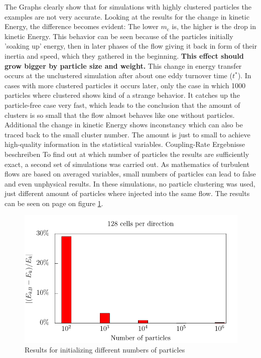 \documentclass[a4paper,10pt]{article}
\numberwithin{equation}{section} %
\begin{document}
The Graphs clearly show that for simulations with highly clustered particles the examples are not very accurate. Looking at the results for the change in kinetic Energy, the difference becomes evident: The lower $ m_\mathrm{c} $ is, the higher is the drop in kinetic Energy. This behavior can be seen because of the particles initially 'soaking up' energy, then in later phases of the flow giving it back in form of their inertia and speed, which they gathered in the beginning. \textbf{This effect should grow bigger by particle size and weight.} This change in energy transfer occurs at the unclustered simulation after about one eddy turnover time ($t^*$). In cases with more clustered particles it occurs later, only the case in which 1000 particles where clustered shows kind of a strange behavior. It catches up the particle-free case very fast, which leads to the conclusion that the amount of clusters is so small that the flow almost behaves like one without particles. Additional the change in kinetic Energy shows inconstancy which can also be traced back to the small cluster number. The amount is just to small to achieve high-quality information in the statistical variables. 
\newline
\newline
Coupling-Rate Ergebnisse beschreiben
\newline
\newline
To find out at which number of particles the results are sufficiently exact, a second set of simulations was carried out. As mathematics of turbulent flows are based on averaged variables, small numbers of particles can lead to false and even unphysical results. In these simulations, no particle clustering was used, just different amount of particles where injected into the same flow. The results can be seen on page \pageref{kineticEnergy_numberOfParticles} on figure \ref{kineticEnergy_numberOfParticles}. 
\begin{figure}[h]
	\centering
  \includegraphics[width=\textwidth]{./../Simulationsergebnisse/variationPartikelAnzahl/128/kineticEnergy_numberOfParticles.pdf}
	\caption{Results for initializing different numbers of particles}
	\label{kineticEnergy_numberOfParticles}
\end{figure}
\end{document}

